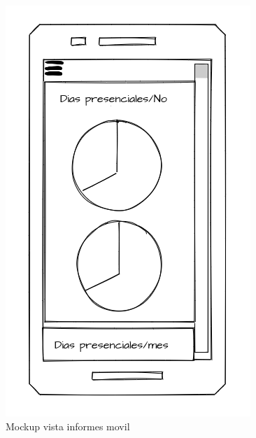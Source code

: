 \documentclass[11pt,spanish,listoffigures,listoftables]{tfgetsinf}
\begin{document}
 \begin{figure}[h!] %
   \includegraphics[width=\linewidth]{img/Vista_Informes_MVL.png}
   \caption{Mockup vista informes movil}
   \label{fig:informesMVL}
 \end{figure}
\end{document}
